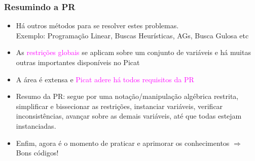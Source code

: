 
\begin{frame}[fragile]
\frametitle{Resumindo a PR}

\begin{itemize}
  \item Há outros métodos para se resolver estes problemas.\\
  Exemplo: Programação Linear, Buscas Heurísticas, AGs, Busca Gulosa  etc

  \pause  
  \item As \textcolor{magenta}{restrições globais} se aplicam sobre um conjunto de variáveis
  e há muitas outras importantes disponíveis no Picat

  \pause
  \item A área é extensa e \textcolor{magenta}{Picat adere há todos requisitos da PR}

  \pause
  \item Resumo da PR: segue por uma notação/manipulação algébrica restrita,
        simplificar e bissecionar as restrições, instanciar variáveis, 
        verificar inconsistências,   avançar sobre as demais variáveis, até que todas 
        estejam instanciadas.
  
  \pause
  \item Enfim, agora é o momento de praticar e aprimorar os conhecimentos $\Rightarrow$ Bons códigos!

\end{itemize}
\end{frame}
